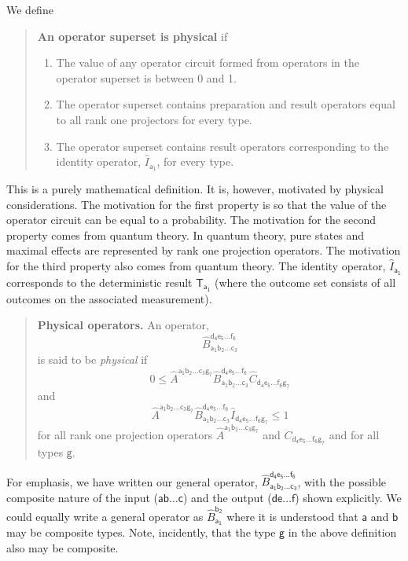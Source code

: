 \documentclass[10pt]{article}
\begin{document}
We define
\begin{quote}
{\bf An operator superset is physical} if
\begin{enumerate}
\item The value of any operator circuit formed from operators in the operator superset is between 0 and 1.
\item The operator superset contains preparation and result operators equal to all rank one projectors for every type.
\item The operator superset contains result operators corresponding to the identity operator, $\hat I_\mathsf{a_1}$, for every type.
\end{enumerate}
\end{quote}
This is a purely mathematical definition.  It is, however, motivated by physical considerations.  The motivation for the first property is so that the value of the operator circuit can be equal to a probability. The motivation for the second property comes from quantum theory.  In quantum theory, pure states and maximal effects are represented by rank one projection operators. The motivation for the third property also comes from quantum theory.  The identity operator, $\hat I_\mathsf{a_1}$ corresponds to the deterministic result $\mathsf T_\mathsf{a_1}$ (where the outcome set consists of all outcomes on the associated measurement).
\begin{quote}
{\bf Physical operators.} An operator,
\begin{equation}
\hat B_\mathsf{a_1b_2\dots c_3}^\mathsf{d_4e_5\dots f_6}
\end{equation}
is said to be \emph{physical} if
\begin{equation}\label{positiveoperatorcondition}
0\leq \hat A^\mathsf{a_1b_2\dots c_3g_7} \hat B_\mathsf{a_1b_2\dots c_3}^\mathsf{d_4e_5\dots f_6} \hat C_\mathsf{d_4e_5\dots f_6g_7}
\end{equation}
and
\begin{equation}\label{traceoperatorcondition}
\hat A^\mathsf{a_1b_2\dots c_3g_7} \hat B_\mathsf{a_1b_2\dots c_3}^\mathsf{d_4e_5\dots f_6}\hat I_\mathsf{d_4e_5\dots f_6g_7} \leq 1
\end{equation}
for all rank one projection operators $\hat A^\mathsf{a_1b_2\dots c_3g_7}$ and $C_\mathsf{d_4e_5\dots f_6g_7}$ and for all types $\mathsf g$.
\end{quote}
For emphasis, we have written our general operator, $\hat B_\mathsf{a_1b_2\dots c_3}^\mathsf{d_4e_5\dots f_6}$, with the possible composite nature of the input ($\mathsf{ab\dots c}$) and the output ($\mathsf{de\dots f}$) shown explicitly.  We could equally write a general operator as $\hat B_\mathsf{a_1}^\mathsf{b_2}$ where it is understood that $\mathsf a$ and $\mathsf b$ may be composite types.  Note, incidently, that the type $\mathsf{g}$ in the above definition also may be composite.
\end{document}
